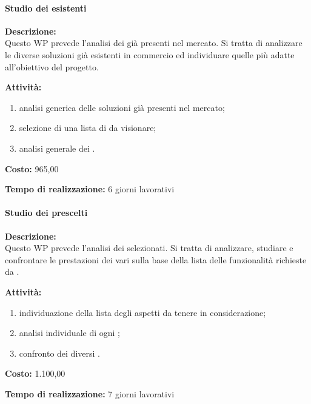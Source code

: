 \paragraph{\bfseries\sffamily{}Studio dei \sw esistenti }
\begin{description}
\item{\bfseries Descrizione:}\\
Questo WP prevede l'analisi dei \sw già presenti nel mercato. Si tratta di analizzare le diverse soluzioni già esistenti in commercio ed individuare quelle più adatte all'obiettivo del progetto. 
\item{\bfseries Attività:}
\begin{enumerate}
	\item analisi generica delle soluzioni \sw già presenti nel mercato;
	\item selezione di una lista di \sw da visionare;
	\item analisi generale dei \sw.
\end{enumerate}
\item{\bfseries Costo:} \text{\euro} 965,00 
\item{\bfseries Tempo di realizzazione:} 6 giorni lavorativi
\end{description}

\paragraph{\bfseries\sffamily{}Studio dei \sw prescelti}
\begin{description}
\item{\bfseries Descrizione:}\\
Questo WP prevede l'analisi dei \sw selezionati. Si tratta di analizzare, studiare e confrontare le prestazioni dei vari \sw sulla base della lista delle funzionalità richieste da \customer.
\item  {\bfseries Attività:}
\begin{enumerate}
	\item individuazione della lista degli aspetti da tenere in considerazione;
	\item analisi individuale di ogni \sw;
	\item confronto dei diversi \sw.
	\end{enumerate}
\item{\bfseries Costo:} \text{\euro} 1.100,00 
\item{\bfseries Tempo di realizzazione:} 7 giorni lavorativi
\end{description}

